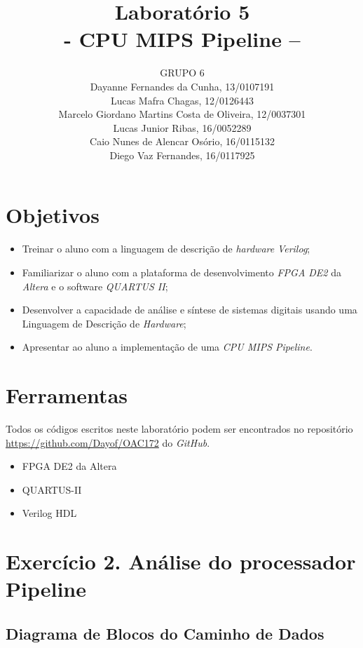 \documentclass[12pt]{article}
\title{Laboratório 5\\- CPU MIPS Pipeline –}
\author{GRUPO 6\\
	Dayanne Fernandes da Cunha, 13/0107191\\
	Lucas Mafra Chagas, 12/0126443\\
	Marcelo Giordano Martins Costa de Oliveira, 12/0037301\\
	Lucas Junior Ribas, 16/0052289\\
	Caio Nunes de Alencar Osório, 16/0115132\\
	Diego Vaz Fernandes, 16/0117925}
\begin{document}
\maketitle

\section{Objetivos}
\label{sec:Objetivos}

\begin{itemize}
\item Treinar o aluno com a linguagem de descrição de \textit{hardware} \textit{Verilog};
\item Familiarizar o aluno com a plataforma de desenvolvimento \textit{FPGA DE2} da \textit{Altera} e o software \textit{QUARTUS II};
\item Desenvolver a capacidade de análise e síntese de sistemas digitais usando uma Linguagem de Descrição de \textit{Hardware};
\item Apresentar ao aluno a implementação de uma \textit{CPU MIPS Pipeline}.
\end{itemize}

\section{Ferramentas}
\label{sec:Materiais}

Todos os códigos escritos neste laboratório podem ser encontrados no repositório \url{https://github.com/Dayof/OAC172} do \textit{GitHub}.

\begin{itemize}
\item FPGA DE2 da Altera 
\item QUARTUS-II
\item Verilog HDL
\end{itemize}

\section{Exercício 2. Análise do processador Pipeline}
\label{sec:pipeline}

\subsection{Diagrama de Blocos do Caminho de Dados}
\end{document}
